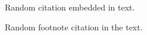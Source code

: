 \documentclass{article}
\begin{document}
Random citation \cite{BOOK:1} embedded in text.

Random footnote citation \autocite[1]{EINSTEIN} in the text.

\newpage

\printbibliography  %
\end{document}
